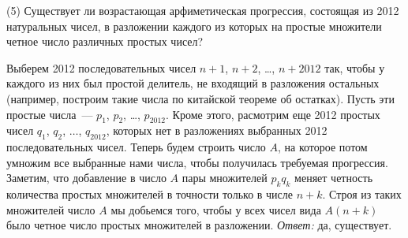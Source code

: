 \textsf{(5)}
Существует ли возрастающая арфиметическая прогрессия, состоящая из 2012
натуральных чисел, в разложении каждого из которых на простые множители четное
число различных простых чисел?

\solution
Выберем 2012 последовательных чисел
$n + 1$, $n + 2$, \ldots, $n + 2012$ так,
чтобы у каждого из них был простой делитель, не входящий в разложения остальных
(например, построим такие числа по китайской теореме об остатках).
Пусть эти простые числа~--- $p_1$, $p_2$, \ldots, $p_{2012}$.
Кроме этого, расмотрим еще 2012 простых чисел
$q_1$, $q_2$, $\ldots$, $q_{2012}$,
которых нет в разложениях выбранных 2012 последовательных чисел.
Теперь будем строить число $A$, на которое потом умножим все выбранные нами
числа, чтобы получилась требуемая прогрессия.
Заметим, что добавление в число $A$ пары множителей $p_k q_k$ меняет четность
количества простых множителей в точности только в числе $n + k$.
Строя из таких множителей число $A$ мы добьемся того, чтобы у всех чисел вида
$A (n + k)$ было четное число простых множителей в разложении.
\emph{Ответ:} да, существует.

